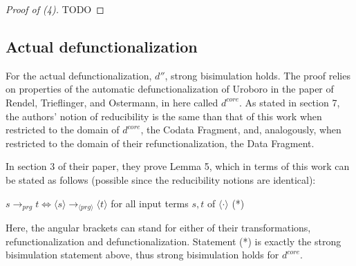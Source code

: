 \documentclass[11pt]{article} %
\begin{document}
\begin{proof}[Proof of (4)]

TODO

\end{proof}

\subsection{Actual defunctionalization}

For the actual defunctionalization, $d''$, strong bisimulation holds. The proof relies on properties of the automatic defunctionalization of Uroboro in the paper of Rendel, Trieflinger, and Ostermann, in here called $d^{core}$. As stated in section 7, the authors' notion of reducibility is the same than that of this work when restricted to the domain of $d^{core}$, the Codata Fragment, and, analogously, when restricted to the domain of their refunctionalization, the Data Fragment.

In section 3 of their paper, they prove Lemma 5, which in terms of this work can be stated as follows (possible since the reducibility notions are identical):

$s \longrightarrow_{prg} t \iff \langle s \rangle \longrightarrow_{\langle prg \rangle} \langle t \rangle$ for all input terms $s,t$ of $\langle \cdot \rangle$ (*)

Here, the angular brackets can stand for either of their transformations, refunctionalization and defunctionalization. Statement (*) is exactly the strong bisimulation statement above, thus strong bisimulation holds for $d^{core}$.
\end{document}
